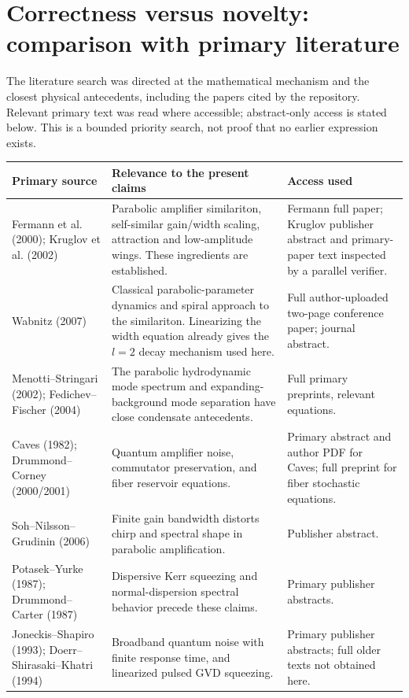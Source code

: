 \documentclass[11pt,a4paper]{article}
\begin{document}
\section{Correctness versus novelty: comparison with primary literature}

The literature search was directed at the mathematical mechanism and the closest physical antecedents, including the papers cited by the repository. Relevant primary text was read where accessible; abstract-only access is stated below. This is a bounded priority search, not proof that no earlier expression exists.

\begin{longtable}{@{}p{}p{}p{}@{}}
\toprule
Primary source & Relevance to the present claims & Access used \\\midrule\endhead
Fermann et al. (2000); Kruglov et al. (2002) \cite{fermann,kruglov} & Parabolic amplifier similariton, self-similar gain/width scaling, attraction and low-amplitude wings. These ingredients are established. & Fermann full paper; Kruglov publisher abstract and primary-paper text inspected by a parallel verifier. \\
Wabnitz (2007) \cite{wabnitz} & Classical parabolic-parameter dynamics and spiral approach to the similariton. Linearizing the width equation already gives the $l=2$ decay mechanism used here. & Full author-uploaded two-page conference paper; journal abstract. \\
Menotti--Stringari (2002); Fedichev--Fischer (2004) \cite{menotti,fedichev} & The parabolic hydrodynamic mode spectrum and expanding-background mode separation have close condensate antecedents. & Full primary preprints, relevant equations. \\
Caves (1982); Drummond--Corney (2000/2001) \cite{caves,drummondcorney} & Quantum amplifier noise, commutator preservation, and fiber reservoir equations. & Primary abstract and author PDF for Caves; full preprint for fiber stochastic equations. \\
Soh--Nilsson--Grudinin (2006) \cite{soh} & Finite gain bandwidth distorts chirp and spectral shape in parabolic amplification. & Publisher abstract. \\
Potasek--Yurke (1987); Drummond--Carter (1987) \cite{potasek,drummondcarter} & Dispersive Kerr squeezing and normal-dispersion spectral behavior precede these claims. & Primary publisher abstracts. \\
Joneckis--Shapiro (1993); Doerr--Shirasaki--Khatri (1994) \cite{joneckis,doerr} & Broadband quantum noise with finite response time, and linearized pulsed GVD squeezing. & Primary publisher abstracts; full older texts not obtained here. \\

\end{longtable}
\end{document}
